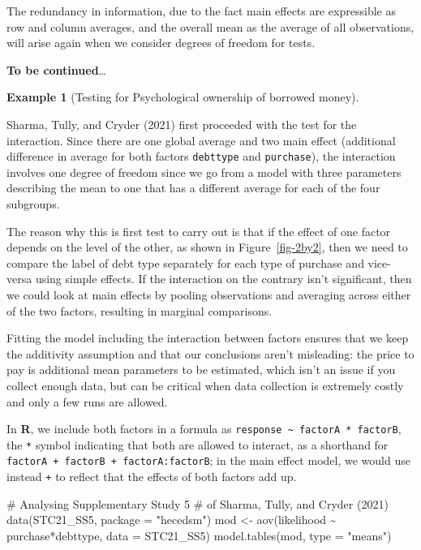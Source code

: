 \documentclass[
  11pt,
  letterpaper,
]{scrbook}
\newenvironment{Shaded}{\begin{snugshade}}{\end{snugshade}}
\newcommand{\AttributeTok}[1]{\textcolor[rgb]{0.40,0.45,0.13}{#1}}
\newcommand{\CommentTok}[1]{\textcolor[rgb]{0.37,0.37,0.37}{#1}}
\newcommand{\FunctionTok}[1]{\textcolor[rgb]{0.28,0.35,0.67}{#1}}
\newcommand{\NormalTok}[1]{\textcolor[rgb]{0.00,0.23,0.31}{#1}}
\newcommand{\OtherTok}[1]{\textcolor[rgb]{0.00,0.23,0.31}{#1}}
\newcommand{\SpecialCharTok}[1]{\textcolor[rgb]{0.37,0.37,0.37}{#1}}
\newcommand{\StringTok}[1]{\textcolor[rgb]{0.13,0.47,0.30}{#1}}
\theoremstyle{definition}
\newtheorem{example}{Example}[chapter]
\theoremstyle{definition}
\theoremstyle{remark}
\begin{document}
The redundancy in information, due to the fact main effects are
expressible as row and column averages, and the overall mean as the
average of all observations, will arise again when we consider degrees
of freedom for tests.

\textbf{To be continued}\ldots{}

\begin{example}[Testing for Psychological ownership of borrowed
money]\protect\hypertarget{exm-borrowed-money-test}{}\label{exm-borrowed-money-test}

Sharma, Tully, and Cryder (2021) first proceeded with the test for the
interaction. Since there are one global average and two main effect
(additional difference in average for both factors \texttt{debttype} and
\texttt{purchase}), the interaction involves one degree of freedom since
we go from a model with three parameters describing the mean to one that
has a different average for each of the four subgroups.

The reason why this is first test to carry out is that if the effect of
one factor depends on the level of the other, as shown in
Figure~\ref{fig-2by2}, then we need to compare the label of debt type
separately for each type of purchase and vice-versa using simple
effects. If the interaction on the contrary isn't significant, then we
could look at main effects by pooling observations and averaging across
either of the two factors, resulting in marginal comparisons.

Fitting the model including the interaction between factors ensures that
we keep the additivity assumption and that our conclusions aren't
misleading: the price to pay is additional mean parameters to be
estimated, which isn't an issue if you collect enough data, but can be
critical when data collection is extremely costly and only a few runs
are allowed.

In \textbf{R}, we include both factors in a formula as
\texttt{response\ \textasciitilde{}\ factorA\ *\ factorB}, the
\texttt{*} symbol indicating that both are allowed to interact, as a
shorthand for \texttt{factorA\ +\ factorB\ +\ factorA:factorB}; in the
main effect model, we would use instead \texttt{+} to reflect that the
effects of both factors add up.

\begin{Shaded}
\begin{Highlighting}[]
\CommentTok{\# Analysing Supplementary Study 5}
\CommentTok{\# of Sharma, Tully, and Cryder (2021)}
\FunctionTok{data}\NormalTok{(STC21\_SS5, }\AttributeTok{package =} \StringTok{"hecedsm"}\NormalTok{)}
\NormalTok{mod }\OtherTok{\textless{}{-}} \FunctionTok{aov}\NormalTok{(likelihood }\SpecialCharTok{\textasciitilde{}}\NormalTok{ purchase}\SpecialCharTok{*}\NormalTok{debttype, }
           \AttributeTok{data =}\NormalTok{ STC21\_SS5)}
\FunctionTok{model.tables}\NormalTok{(mod, }\AttributeTok{type =} \StringTok{"means"}\NormalTok{)}
\end{Highlighting}
\end{Shaded}


\end{example}
\end{document}
